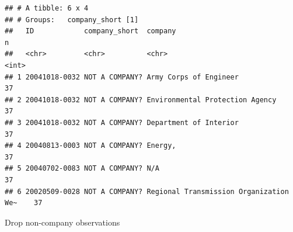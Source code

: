 \documentclass[]{article}
\newenvironment{Shaded}{\begin{snugshade}}{\end{snugshade}}
\newcommand{\KeywordTok}[1]{\textcolor[rgb]{0.13,0.29,0.53}{\textbf{#1}}}
\newcommand{\DataTypeTok}[1]{\textcolor[rgb]{0.13,0.29,0.53}{#1}}
\newcommand{\StringTok}[1]{\textcolor[rgb]{0.31,0.60,0.02}{#1}}
\newcommand{\CommentTok}[1]{\textcolor[rgb]{0.56,0.35,0.01}{\textit{#1}}}
\newcommand{\OperatorTok}[1]{\textcolor[rgb]{0.81,0.36,0.00}{\textbf{#1}}}
\newcommand{\NormalTok}[1]{#1}
\begin{document}
\begin{verbatim}
## # A tibble: 6 x 4
## # Groups:   company_short [1]
##   ID            company_short  company                                    n
##   <chr>         <chr>          <chr>                                  <int>
## 1 20041018-0032 NOT A COMPANY? Army Corps of Engineer                    37
## 2 20041018-0032 NOT A COMPANY? Environmental Protection Agency           37
## 3 20041018-0032 NOT A COMPANY? Department of Interior                    37
## 4 20040813-0003 NOT A COMPANY? Energy,                                   37
## 5 20040702-0083 NOT A COMPANY? N/A                                       37
## 6 20020509-0028 NOT A COMPANY? Regional Transmission Organization We~    37
\end{verbatim}

\begin{Shaded}
\end{Shaded}

Drop non-company observations

\begin{Shaded}
\end{Shaded}
\end{document}
